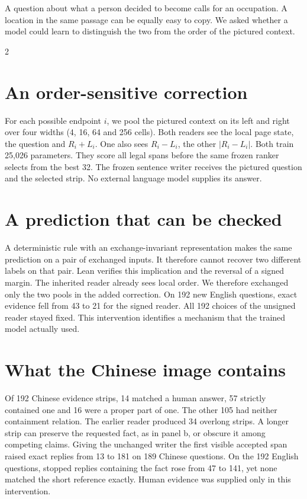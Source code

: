 \noindent A question about what a person decided to become calls for an occupation. A location in the same passage can be equally easy to copy. We asked whether a model could learn to distinguish the two from the order of the pictured context.
\begin{multicols}{2}
\section*{An order-sensitive correction}
For each possible endpoint $i$, we pool the pictured context on its left and right over four widths (4, 16, 64 and 256 cells). Both readers see the local page state, the question and $R_i+L_i$. One also sees $R_i-L_i$, the other $|R_i-L_i|$. Both train 25,026 parameters. They score all legal spans before the same frozen ranker selects from the best 32. The frozen sentence writer receives the pictured question and the selected strip. No external language model supplies its answer.
\section*{A prediction that can be checked}
A deterministic rule with an exchange-invariant representation makes the same prediction on a pair of exchanged inputs. It therefore cannot recover two different labels on that pair. Lean verifies this implication and the reversal of a signed margin. The inherited reader already sees local order. We therefore exchanged only the two pools in the added correction. On 192 new English questions, exact evidence fell from 43 to 21 for the signed reader. All 192 choices of the unsigned reader stayed fixed. This intervention identifies a mechanism that the trained model actually used.
\section*{What the Chinese image contains}
Of 192 Chinese evidence strips, 14 matched a human answer, 57 strictly contained one and 16 were a proper part of one. The other 105 had neither containment relation. The earlier reader produced 34 overlong strips. A longer strip can preserve the requested fact, as in panel b, or obscure it among competing claims. Giving the unchanged writer the first visible accepted span raised exact replies from 13 to 181 on 189 Chinese questions. On the 192 English questions, stopped replies containing the fact rose from 47 to 141, yet none matched the short reference exactly. Human evidence was supplied only in this intervention.
\end{multicols}
